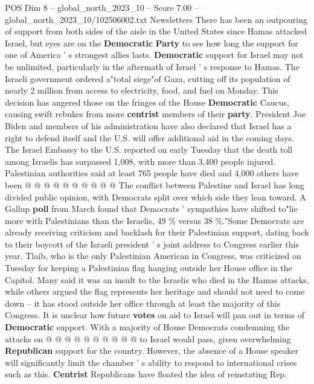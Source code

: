 \begin{textsample}{POS Dim 8 – global\_north\_2023\_10 – Score 7.00 – global\_north\_2023\_10/102506002.txt}  \label{ex:f8_pos_246}
Newsletters There has been an outpouring of support from both sides of the aisle in the United States since Hamas attacked Israel, but eyes are on the \textbf{Democratic} \textbf{Party} to see how long the support for one of America ' s strongest allies lasts. \textbf{Democratic} support for Israel may not be unlimited, particularly in the aftermath of Israel ' s response to Hamas.
The Israeli government ordered a"total siege"of Gaza, cutting off its population of nearly 2 million from access to electricity, food, and fuel on Monday.
This decision has angered those on the fringes of the House \textbf{Democratic} Caucus, causing swift rebukes from more \textbf{centrist} members of their \textbf{party}.
President Joe Biden and members of his administration have also declared that Israel has a right to defend itself and the U.S. will offer additional aid in the coming days.
The Israel Embassy to the U.S. reported on early Tuesday that the death toll among Israelis has surpassed 1,008, with more than 3,400 people injured.
Palestinian authorities said at least 765 people have died and 4,000 others have been @ @ @ @ @ @ @ @ @ @ The conflict between Palestine and Israel has long divided public opinion, with Democrats split over which side they lean toward.
A Gallup \textbf{poll} from March found that Democrats ' sympathies have shifted to"lie more with Palestinians than the Israelis, 49 \% versus 38 \%."Some Democrats are already receiving criticism and backlash for their Palestinian support, dating back to their boycott of the Israeli president ' s joint address to Congress earlier this year.
Tlaib, who is the only Palestinian American in Congress, was criticized on Tuesday for keeping a Palestinian flag hanging outside her House office in the Capitol.
Many said it was an insult to the Israelis who died in the Hamas attacks, while others argued the flag represents her heritage and should not need to come down -- it has stood outside her office through at least the majority of this Congress.
It is unclear how future \textbf{votes} on aid to Israel will pan out in terms of \textbf{Democratic} support.
With a majority of House Democrats condemning the attacks on @ @ @ @ @ @ @ @ @ @ to Israel would pass, given overwhelming \textbf{Republican} support for the country.
However, the absence of a House speaker will significantly limit the chamber ' s ability to respond to international crises such as this. \textbf{Centrist} Republicans have floated the idea of reinstating Rep.

\end{textsample}
